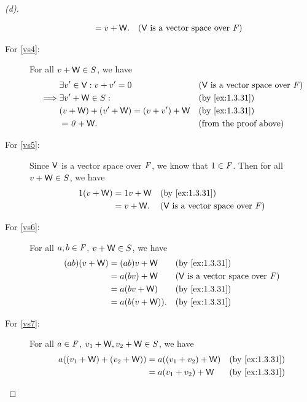 \begin{proof}[(d)]
\begin{description}
\begin{align*}
                              & = v + \mathsf{W}.        &  & \text{(\(\mathsf{V}\) is a vector space over \(\mathit{F}\))}
      \end{align*}
    \item[For \ref{vs4}:]
      For all \(v + \mathsf{W} \in S\), we have
      \begin{align*}
                 & \exists v' \in \V : v + v' = 0       &  & \text{(\(\V\) is a vector space over \(\F\))} \\
        \implies & \exists v' + \W \in S :              &  & \by{ex:1.3.31}                                \\
                 & (v + \W) + (v' + \W) = (v + v') + \W &  & \by{ex:1.3.31}                                \\
                 & = \zv + \W.                          &  & \text{(from the proof above)}
      \end{align*}
    \item[For \ref{vs5}:]
      Since \(\mathsf{V}\) is a vector space over \(\mathit{F}\), we know that \(1 \in \mathit{F}\).
      Then for all \(v + \mathsf{W} \in S\), we have
      \begin{align*}
        1(v + \W) & = 1v + \W &  & \by{ex:1.3.31}                                \\
                  & = v + \W. &  & \text{(\(\V\) is a vector space over \(\F\))}
      \end{align*}
    \item[For \ref{vs6}:]
      For all \(a, b \in \mathit{F}\), \(v + \mathsf{W} \in S\), we have
      \begin{align*}
        (ab) (v + \W) & = (ab)v + \W    &  & \by{ex:1.3.31}                                \\
                      & = a(bv) + \W    &  & \text{(\(\V\) is a vector space over \(\F\))} \\
                      & = a(bv + \W)    &  & \by{ex:1.3.31}                                \\
                      & = a(b(v + \W)). &  & \by{ex:1.3.31}
      \end{align*}
    \item[For \ref{vs7}:]
      For all \(a \in \mathit{F}\), \(v_1 + \mathsf{W}, v_2 + \mathsf{W} \in S\), we have
      \begin{align*}
        a((v_1 + \W) + (v_2 + \W)) & = a((v_1 + v_2) + \W)        &  & \by{ex:1.3.31}                                \\
                                   & = a(v_1 + v_2) + \W          &  & \by{ex:1.3.31}                                \\

\end{align*}
\end{description}
\end{proof}
